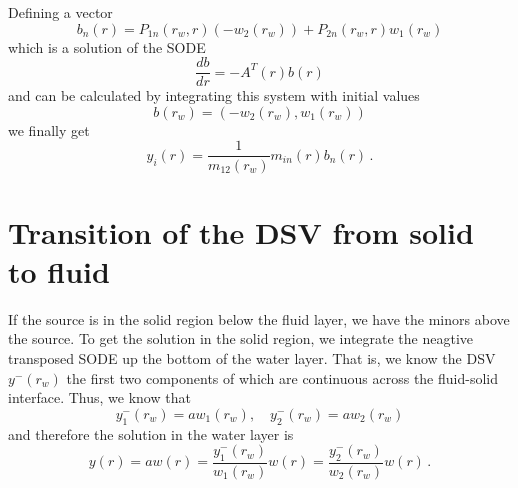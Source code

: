\documentclass[11pt,a4paper]{article}
\begin{document}
Defining a vector 
\begin{equation}
b_n(r)=P_{1n}(r_w,r)(-w_2(r_w))+P_{2n}(r_w,r)w_1(r_w)
\end{equation}
which is a solution of the SODE
\begin{equation}
\frac{db}{dr}=-A^T(r) b(r)
\end{equation}
and can be calculated by integrating this system with initial values 
\begin{equation}
b(r_w)=(-w_2(r_w),w_1(r_w))
\end{equation}
we finally get
\begin{equation}
y_i(r)=\frac{1}{m_{12}(r_w)}m_{in}(r) b_n(r) \,.
\end{equation}
%
\section{Transition of the DSV from solid to fluid}
%
If the source is in the solid region below the fluid layer, we have the minors above the source. To get the solution in the solid region, we integrate the neagtive transposed SODE up the bottom of the water layer. That is, we know the DSV $y^-(r_w)$ the first two components of which are continuous across the fluid-solid interface. Thus, we know that
\begin{equation}
y_1^-(r_w)=aw_1(r_w), \quad y_2^-(r_w)=aw_2(r_w)
\end{equation}
and therefore the solution in the water layer is
\begin{equation}
y(r)=aw(r)=\frac{y^-_1(r_w)}{w_1(r_w)} w(r) = \frac{y^-_2(r_w)}{w_2(r_w)} w(r) \,.
\end{equation}
\end{document}
